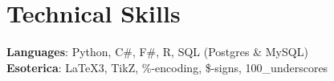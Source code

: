 \documentclass[letterpaper,11pt]{article}
\begin{document}
\section{Technical Skills}
 \begin{itemize}[leftmargin=0.15in, label={}]
    \small{\item{
     \textbf{Languages}{: Python, C\#, F\#, R, SQL (Postgres \& MySQL)} \\
     \textbf{Esoterica}{: LaTeX3, TikZ, \%-encoding, \$-signs, 100\_underscores} \\
    }}
 \end{itemize}
\end{document}
